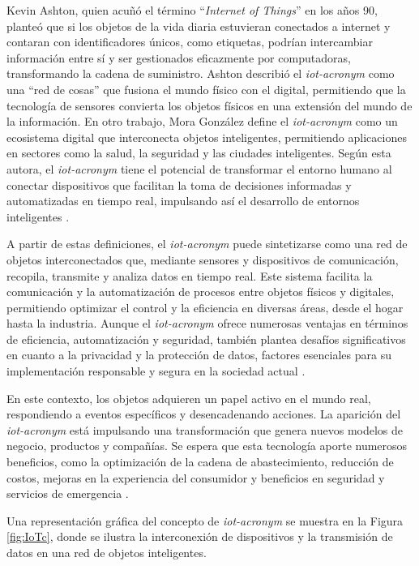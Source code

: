 Kevin Ashton, quien acuñó el término “\textit{Internet of Things}” en los años 90, planteó que si los objetos de la vida diaria estuvieran conectados a internet y contaran con identificadores únicos, como etiquetas, podrían intercambiar información entre sí y ser gestionados eficazmente por computadoras, transformando la cadena de suministro. Ashton describió el \textit{\acrshort{iot-acronym}} como una “red de cosas” que fusiona el mundo físico con el digital, permitiendo que la tecnología de sensores convierta los objetos físicos en una extensión del mundo de la información. En otro trabajo, Mora González define el \textit{\acrshort{iot-acronym}} como un ecosistema digital que interconecta objetos inteligentes, permitiendo aplicaciones en sectores como la salud, la seguridad y las ciudades inteligentes. Según esta autora, el \textit{\acrshort{iot-acronym}} tiene el potencial de transformar el entorno humano al conectar dispositivos que facilitan la toma de decisiones informadas y automatizadas en tiempo real, impulsando así el desarrollo de entornos inteligentes \cite{mora2015}.

A partir de estas definiciones, el \textit{\acrshort{iot-acronym}} puede sintetizarse como una red de objetos interconectados que, mediante sensores y dispositivos de comunicación, recopila, transmite y analiza datos en tiempo real. Este sistema facilita la comunicación y la automatización de procesos entre objetos físicos y digitales, permitiendo optimizar el control y la eficiencia en diversas áreas, desde el hogar hasta la industria. Aunque el \textit{\acrshort{iot-acronym}} ofrece numerosas ventajas en términos de eficiencia, automatización y seguridad, también plantea desafíos significativos en cuanto a la privacidad y la protección de datos, factores esenciales para su implementación responsable y segura en la sociedad actual \cite{alonso2016}.

En este contexto, los objetos adquieren un papel activo en el mundo real, respondiendo a eventos específicos y desencadenando acciones. La aparición del \textit{\acrshort{iot-acronym}} está impulsando una transformación que genera nuevos modelos de negocio, productos y compañías. Se espera que esta tecnología aporte numerosos beneficios, como la optimización de la cadena de abastecimiento, reducción de costos, mejoras en la experiencia del consumidor y beneficios en seguridad y servicios de emergencia \cite{martinez2019red}.

Una representación gráfica del concepto de \textit{\acrshort{iot-acronym}} se muestra en la Figura \ref{fig:IoTc}, donde se ilustra la interconexión de dispositivos y la transmisión de datos en una red de objetos inteligentes.


